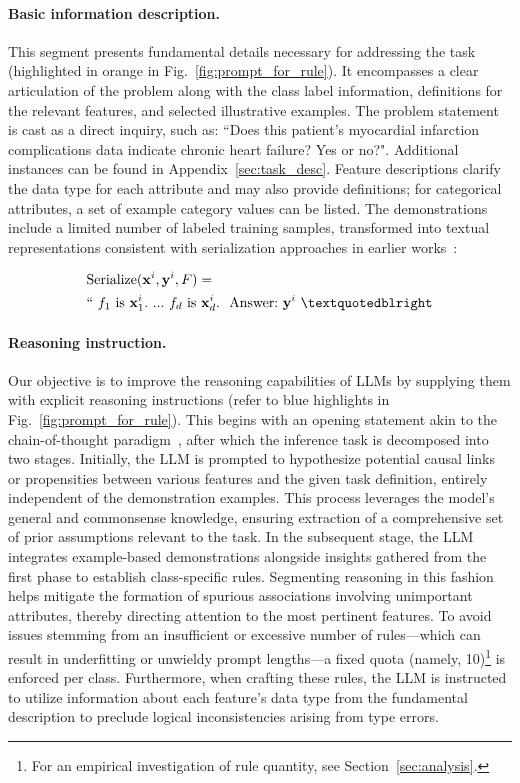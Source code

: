 \vspace*{-0.12in}
\paragraph{Basic information description.} This segment presents fundamental details necessary for addressing the task (highlighted in orange in Fig.~\ref{fig:prompt_for_rule}). It encompasses a clear articulation of the problem along with the class label information, definitions for the relevant features, and selected illustrative examples. The problem statement is cast as a direct inquiry, such as: ``Does this patient's myocardial infarction complications data indicate chronic heart failure? Yes or no?". Additional instances can be found in Appendix~\ref{sec:task_desc}. Feature descriptions clarify the data type for each attribute and may also provide definitions; for categorical attributes, a set of example category values can be listed. The demonstrations include a limited number of labeled training samples, transformed into textual representations consistent with serialization approaches in earlier works~\cite{dinh2022lift,hegselmann2023tabllm}:

\begin{align}
&\text{Serialize}(\mathbf{x}^i,\mathbf{y}^i, F) = \nonumber \\ 
&``\ f_1\ \text{is}\ \mathbf{x}^i_1.\ ... \ f_d\  \text{is}\  \mathbf{x}^i_d.\ \ \text{Answer:}\  \mathbf{y}^i\ ”
\end{align}

\vspace*{-0.12in}
\paragraph{Reasoning instruction.} Our objective is to improve the reasoning capabilities of LLMs by supplying them with explicit reasoning instructions (refer to blue highlights in Fig.~\ref{fig:prompt_for_rule}). This begins with an opening statement akin to the chain-of-thought paradigm~\cite{wei2022chain}, after which the inference task is decomposed into two stages. Initially, the LLM is prompted to hypothesize potential causal links or propensities between various features and the given task definition, entirely independent of the demonstration examples. This process leverages the model's general and commonsense knowledge, ensuring extraction of a comprehensive set of prior assumptions relevant to the task. In the subsequent stage, the LLM integrates example-based demonstrations alongside insights gathered from the first phase to establish class-specific rules. Segmenting reasoning in this fashion helps mitigate the formation of spurious associations involving unimportant attributes, thereby directing attention to the most pertinent features. To avoid issues stemming from an insufficient or excessive number of rules—which can result in underfitting or unwieldy prompt lengths—a fixed quota (namely, 10)\footnote{For an empirical investigation of rule quantity, see Section~\ref{sec:analysis}.} is enforced per class. Furthermore, when crafting these rules, the LLM is instructed to utilize information about each feature's data type from the fundamental description to preclude logical inconsistencies arising from type errors.

